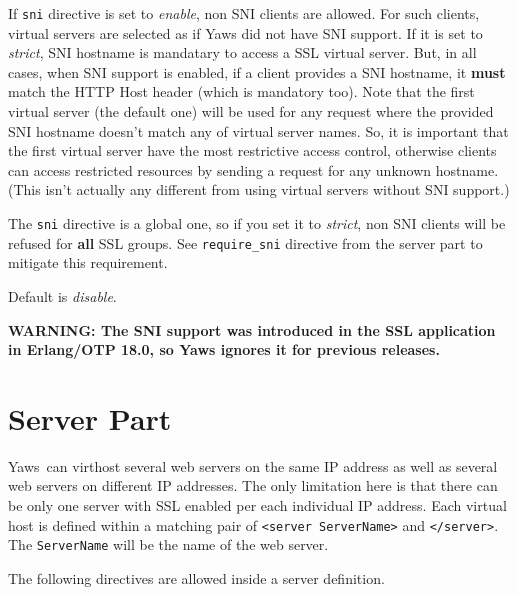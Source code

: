 \documentclass[11pt,oneside,english]{book}
\newcommand{\Yaws}            %
        {{\sc Yaws}}
\begin{document}
\begin{itemize}
              If \verb+sni+ directive is set to \textit{enable}, non SNI clients
              are allowed. For such clients, virtual servers are selected as if
              Yaws did not have SNI support. If it is set to \textit{strict},
              SNI hostname is mandatary to access a SSL virtual server. But, in
              all cases, when SNI support is enabled, if a client provides a SNI
              hostname, it \textbf{must} match the HTTP Host header (which is
              mandatory too). Note that the first virtual server (the default
              one) will be used for any request where the provided SNI hostname
              doesn't match any of virtual server names. So, it is important
              that the first virtual server have the most restrictive access
              control, otherwise clients can access restricted resources by
              sending a request for any unknown hostname. (This isn't actually
              any different from using virtual servers without SNI support.)

              The \verb+sni+ directive is a global one, so if you set it to
              \textit{strict}, non SNI clients will be refused for \textbf{all}
              SSL groups. See \verb+require_sni+ directive from the server part
              to mitigate this requirement.

              Default is \textit{disable}.

              \textbf{WARNING: The SNI support was introduced in the SSL
                application in Erlang/OTP 18.0, so Yaws ignores it for previous
                releases.}
\end{itemize}



\section{Server Part}

\Yaws\ can virthost several web servers on the same IP address as well
as several web servers on different IP addresses.  The only limitation
here is that there can be only one server with SSL enabled per each
individual IP address.  Each virtual host is defined within a matching
pair of \verb+<server ServerName>+ and \verb+</server>+.  The
\verb+ServerName+ will be the name of the web server.

The following directives are allowed inside a server definition.
\end{document}
